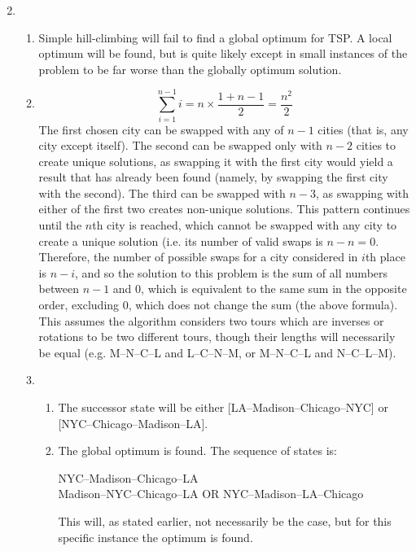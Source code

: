 \documentclass{article}
\begin{document}
\fancyhfoffset[L]{0cm}
\fancyhfoffset[R]{0cm}

\begin{enumerate}
    \setcounter{enumi}{1}
    \item
    \begin{enumerate}
        \item Simple hill-climbing will fail to find a global optimum for TSP.
            A local optimum will be found, but is quite likely except in small instances of the problem to be far worse than the globally optimum solution.

        \item 
            $$\sum_{i = 1}^{n-1}{i} = n\times\frac{1+n-1}{2} = \frac{n^2}{2}$$
            The first chosen city can be swapped with any of $n-1$ cities (that is, any city except itself).
            The second can be swapped only with $n-2$ cities to create unique solutions, as swapping it with the first city would yield a result that has already been found (namely, by swapping the first city with the second).
            The third can be swapped with $n-3$, as swapping with either of the first two creates non-unique solutions.
            This pattern continues until the $n$th city is reached, which cannot be swapped with any city to create a unique solution (i.e. its number of valid swaps is $n-n = 0$.
            Therefore, the number of possible swaps for a city considered in $i$th place is $n-i$, and so the solution to this problem is the sum of all numbers between $n-1$ and $0$, which is equivalent to the same sum in the opposite order, excluding 0, which does not change the sum (the above formula).
            This assumes the algorithm considers two tours which are inverses or rotations to be two different tours, though their lengths will necessarily be equal (e.g. M--N--C--L and L--C--N--M, or M--N--C--L and N--C--L--M).

        \item
        \begin{enumerate}
            \item The successor state will be either [LA--Madison--Chicago--NYC] or [NYC--Chicago--Madison--LA].

            \item The global optimum is found.
                The sequence of states is:
                \begin{center}
                    NYC--Madison--Chicago--LA \\
                    Madison--NYC--Chicago--LA OR NYC--Madison--LA--Chicago\\
                \end{center}
                This will, as stated earlier, not necessarily be the case, but for this specific instance the optimum is found.
        \end{enumerate}

    \end{enumerate}
\end{enumerate}
\end{document}
